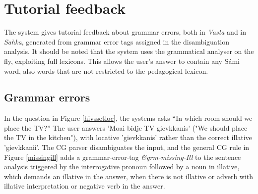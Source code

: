 \documentclass[11pt]{article}
\begin{document}
\section{Tutorial feedback} \label{tutorial}
The system gives tutorial feedback about grammar errors, both in \textit{Vasta} and in \textit{Sahka}, generated from grammar error tags assigned in the disambiguation analysis. It should be noted that the system uses the grammatical analyser on the fly, exploiting full lexicons. This allows the user's answer to contain any Sámi word, also words that are not restricted to the pedagogical lexicon.

\subsection{Grammar errors} \label{grammarerrors}
In the question in Figure \ref{hivssetloc}, the systems asks “In which room should we place the TV?” The user answers 'Moai bidje TV gievkkanis' ("We should place the TV in the kitchen"), with locative 'gievkkanis' rather than the correct illative 'gievkkanii'. The CG parser disambiguates the input, and the general CG rule in Figure \ref{missingill} adds a grammar-error-tag \textit{\&grm-missing-Ill} to the sentence analysis triggered by the interrogative pronoun followed by a noun in illative, which demands an illative in the answer, when there is not illative or adverb with illative interpretation or negative verb in the answer.  \\ 
\end{document}
